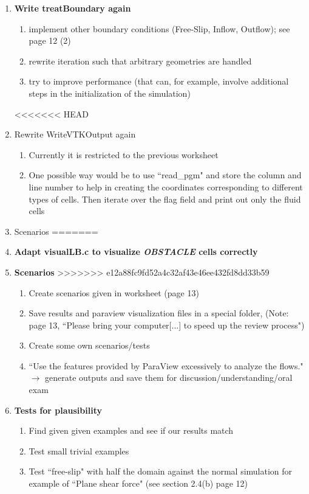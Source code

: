 \documentclass[a4paper]{article}
\newcommand{\qm}[1]{``#1"}							%
\newcommand{\ra}{\rightarrow}						%
\begin{document}
\begin{enumerate}
\item  \textbf{Write treatBoundary again}
\begin{enumerate}
\item implement other boundary conditions (Free-Slip, Inflow, Outflow); see page 12 (2)
\item rewrite iteration such that arbitrary geometries are handled
\item try to improve performance (that can, for example, involve additional steps in the initialization of the simulation)
\end{enumerate}

<<<<<<< HEAD
\item Rewrite WriteVTKOutput again
\begin{enumerate}
	\item Currently it is restricted to the previous worksheet
	\item One possible way would be to use \qm{read\_pgm} and store the column and line number to help in creating the coordinates corresponding to different types of cells. Then iterate over the flag field and print out only the fluid cells
\end{enumerate}

\item Scenarios
=======
\item \textbf{Adapt visualLB.c to visualize \textsl{OBSTACLE} cells correctly}

\item \textbf{Scenarios}
>>>>>>> e12a88fc9fd52a4c32af43e46ee432fd8dd33b59
\begin{enumerate}
\item Create scenarios given in worksheet (page 13)
\item Save results and paraview visualization files in a special folder, (Note: page 13, \qm{Please bring your computer[...] to speed up the review process})
\item Create some own scenarios/tests
\item \qm{Use the features provided by ParaView excessively to analyze the flows.} $ \ra $ generate outputs and save them for discussion/understanding/oral exam
\end{enumerate}

\item \textbf{Tests for plausibility}
\begin{enumerate}
\item Find given given examples and see if our results match
\item Test small trivial examples
\item Test \qm{free-slip} with half the domain against the normal simulation for example of \qm{Plane shear force} (see section 2.4(b) page 12)
\end{enumerate}

\end{enumerate} 
\end{document}
